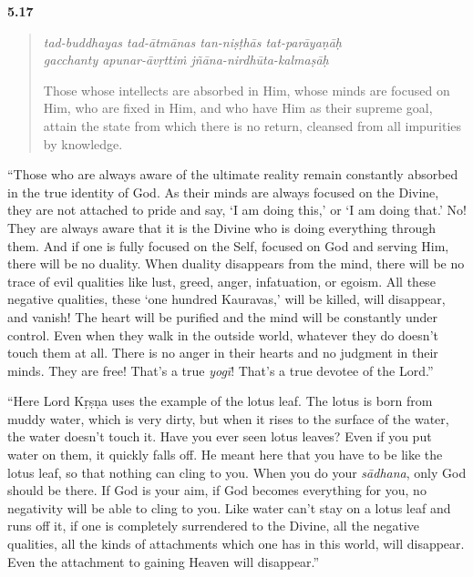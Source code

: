 \par\noindent\textbf{5.17}\par
\begin{verse}
\textit{tad-buddhayas tad-ātmānas tan-niṣṭhās tat-parāyaṇāḥ} \\
\textit{gacchanty apunar-āvṛttiṁ jñāna-nirdhūta-kalmaṣāḥ}

\noindent Those whose intellects are absorbed in Him, whose minds are focused on Him, who are fixed in Him, and who have Him as their supreme goal, attain the state from which there is no return, cleansed from all impurities by knowledge.
\end{verse}
\par




\enquote{Those who are always aware of the ultimate reality remain constantly absorbed in the true identity of God. As their minds are always focused on the Divine, they are not attached to pride and say, \enquote{I am doing this,} or \enquote{I am doing that.} No! They are always aware that it is the Divine who is doing everything through them. And if one is fully focused on the Self, focused on God and serving Him, there will be no duality. When duality disappears from the mind, there will be no trace of evil qualities like lust, greed, anger, infatuation, or egoism. All these negative qualities, these \enquote{one hundred Kauravas,} will be killed, will disappear, and vanish! The heart will be purified and the mind will be constantly under control. Even when they walk in the outside world, whatever they do doesn’t touch them at all. There is no anger in their hearts and no judgment in their minds. They are free! That’s a true \textit{yogī}! That’s a true devotee of the Lord.}

\enquote{Here Lord Kṛṣṇa uses the example of the lotus leaf. The lotus is born from muddy water, which is very dirty, but when it rises to the surface of the water, the water doesn’t touch it. Have you ever seen lotus leaves? Even if you put water on them, it quickly falls off. He meant here that you have to be like the lotus leaf, so that nothing can cling to you. When you do your \textit{sādhana}, only God should be there. If God is your aim, if God becomes everything for you, no negativity will be able to cling to you. Like water can’t stay on a lotus leaf and runs off it, if one is completely surrendered to the Divine, all the negative qualities, all the kinds of attachments which one has in this world, will disappear. Even the attachment to gaining Heaven will disappear.}


